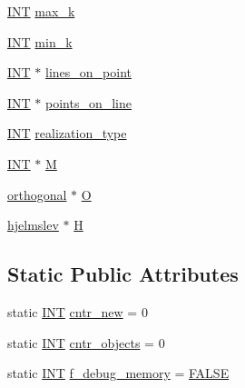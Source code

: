 \begin{DoxyCompactItemize}
\item 
\mbox{\hyperlink{galois_8h_a09fddde158a3a20bd2dcadb609de11dc}{I\+NT}} \mbox{\hyperlink{classincidence__structure_a939a292bc9cbe9fddb627e03ec55a6f9}{max\+\_\+k}}
\item 
\mbox{\hyperlink{galois_8h_a09fddde158a3a20bd2dcadb609de11dc}{I\+NT}} \mbox{\hyperlink{classincidence__structure_a8540e8d6865466799701e2a742c85def}{min\+\_\+k}}
\item 
\mbox{\hyperlink{galois_8h_a09fddde158a3a20bd2dcadb609de11dc}{I\+NT}} $\ast$ \mbox{\hyperlink{classincidence__structure_ac1dc058cff6184c78fefe32e9d648468}{lines\+\_\+on\+\_\+point}}
\item 
\mbox{\hyperlink{galois_8h_a09fddde158a3a20bd2dcadb609de11dc}{I\+NT}} $\ast$ \mbox{\hyperlink{classincidence__structure_a9d31df83b11602f945f413a5459a22fc}{points\+\_\+on\+\_\+line}}
\item 
\mbox{\hyperlink{galois_8h_a09fddde158a3a20bd2dcadb609de11dc}{I\+NT}} \mbox{\hyperlink{classincidence__structure_a5bb54aadc7c20215c809372da81b55ae}{realization\+\_\+type}}
\item 
\mbox{\hyperlink{galois_8h_a09fddde158a3a20bd2dcadb609de11dc}{I\+NT}} $\ast$ \mbox{\hyperlink{classincidence__structure_a24b84578c7991e2cfed88cd96b619a0d}{M}}
\item 
\mbox{\hyperlink{classorthogonal}{orthogonal}} $\ast$ \mbox{\hyperlink{classincidence__structure_ac266ffe8cb44fa64e7c7305cb251df8e}{O}}
\item 
\mbox{\hyperlink{classhjelmslev}{hjelmslev}} $\ast$ \mbox{\hyperlink{classincidence__structure_a4b866b7320ec42c8113f8e4aac1078bd}{H}}
\end{DoxyCompactItemize}
\subsection*{Static Public Attributes}
\begin{DoxyCompactItemize}
\item 
static \mbox{\hyperlink{galois_8h_a09fddde158a3a20bd2dcadb609de11dc}{I\+NT}} \mbox{\hyperlink{classincidence__structure_a6e5f01dbd51fc6d4f676bf06fa585405}{cntr\+\_\+new}} = 0
\item 
static \mbox{\hyperlink{galois_8h_a09fddde158a3a20bd2dcadb609de11dc}{I\+NT}} \mbox{\hyperlink{classincidence__structure_a1b65802d9bab38f0fba4398c81a40e74}{cntr\+\_\+objects}} = 0
\item 
static \mbox{\hyperlink{galois_8h_a09fddde158a3a20bd2dcadb609de11dc}{I\+NT}} \mbox{\hyperlink{classincidence__structure_a2c83210017d33006edf97849baf95afc}{f\+\_\+debug\+\_\+memory}} = \mbox{\hyperlink{nauty_8h_aa93f0eb578d23995850d61f7d61c55c1}{F\+A\+L\+SE}}
\end{DoxyCompactItemize}


